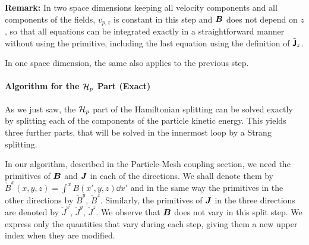 \documentclass[11pt]{article}
\begin{document}
\textbf{Remark:} In two space dimensions keeping all velocity components and all components of the fields, $v_{p,z}$ is constant in this step and ${\boldsymbol B}$ does not depend on $z$, so that
all equations can be integrated exactly in a straightforward manner without using the primitive,
including the last equation using the definition of $\tilde{{\boldsymbol {\rm \mathsf{J}}}}_z$.

In one space dimension, the same also applies to the previous step.

\paragraph{Algorithm for the $\mathcal{H}_p$ Part (Exact)}
\label{sec:splitting_vlasovmaxwell_algo}

As we just saw, the  $\mathcal{H}_p$ part of the Hamiltonian splitting can be solved exactly by splitting each of the components of the particle kinetic energy. This yields three further parts, that will be solved in the innermost loop by a Strang splitting.

In our algorithm, described in the Particle-Mesh coupling section, we need the primitives
of ${\boldsymbol B}$  and ${\boldsymbol J}$ in each of the directions. We shall denote them by
$\check{B}^x(x,y,z) = \int^x B(x',y,z) \dd x'$ and in the same way the primitives in the other directions  by $\check{B}^y$, $\check{B}^z$. Similarly, the primitives of ${\boldsymbol J}$ in the three directions are denoted by $\check{J}^x$, $\check{J}^y$, $\check{J}^z$.
We observe that ${\boldsymbol B}$ does not vary in this split step. We express only the quantities that vary during each step, giving them a new upper index when they are modified.
\end{document}

